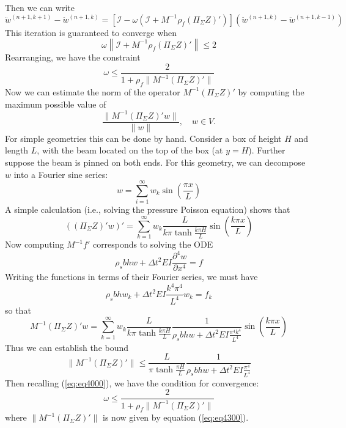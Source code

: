 \documentclass{article}
\begin{document}
Then we can write
\[\ddot{w}^{(n+1,k+1)} - \ddot{w}^{(n+1,k)} = \left[\mathcal{I}-\omega\left(\mathcal{I}+ M^{-1}\rho_f  \left(\Pi_{\Sigma}Z\right)'\right) \right] (\ddot{w}^{(n+1,k)}-\ddot{w}^{(n+1,k-1)}) \]
This iteration is guaranteed to converge when
\[ \omega\left\|\mathcal{I}+ M^{-1}\rho_f  \left(\Pi_{\Sigma}Z\right)'\right\|  \leq 2 \]
Rearranging, we have the constraint
\begin{equation}  \omega \leq \frac{2}{1+\rho_f\|M^{-1}\left(\Pi_{\Sigma}Z\right)'\| } \label{eq:eq4000} \end{equation}
Now we can estimate the norm of the operator $M^{-1}\left(\Pi_{\Sigma}Z\right)'$ by computing the maximum possible value of 
\[\frac{\|M^{-1}\left(\Pi_{\Sigma}Z\right)'w\|}{\|w\|}, \quad w \in V.\]
For simple geometries this can be done by hand. 
Consider a box of height $H$ and length $L$, with the beam located on the top of the box (at $y=H$).
Further suppose the beam is pinned on both ends.
For this geometry, we can decompose $w$ into a Fourier sine series:
\begin{equation} w = \sum_{i=1}^{\infty} w_k \sin{\left(\frac{\pi x}{L} \right)} \label{eq:eq4100} \end{equation}
A simple calculation (i.e., solving the pressure Poisson equation) shows that
\[ \left(\left(\Pi_{\Sigma}Z\right)'w\right)' = \sum_{k=1}^{\infty} w_k\frac{L}{k\pi \tanh{\frac{k\pi H}{L}}} \sin{\left(\frac{k\pi x}{L} \right)} \]
Now computing $M^{-1} f'$ corresponds to solving the ODE
\[ \rho_s b h w + \Delta t^2 EI \frac{\partial ^4 w}{\partial x^4} = f \]
Writing the functions in terms of their Fourier series, 
we must have 
\begin{equation} \rho_s b h w_k + \Delta t^2 EI \frac{k^4 \pi^4}{L^4}w_k = f_k \label{eq:eq4200} \end{equation}
so that 
\[ M^{-1}\left(\Pi_{\Sigma}Z\right)'w= \sum_{k=1}^{\infty} w_k\frac{L}{k\pi \tanh{\frac{k\pi H}{L}}}\frac{1}{\rho_s b h w + \Delta t^2 EI\frac{\pi^4k^4}{L^4}} \sin{\left(\frac{k\pi x}{L} \right)} \]
Thus we can establish the bound
\begin{equation}  \| M^{-1}\left(\Pi_{\Sigma}Z\right)' \| \leq \frac{L}{\pi \tanh{\frac{\pi H}{L}}}\frac{1}{\rho_s b h w + \Delta t^2 EI\frac{\pi^4}{L^4}} \label{eq:eq4300} \end{equation}
Then recalling (\ref{eq:eq4000}), we have the condition for convergence:
\[ \omega \leq \frac{2}{1+\rho_f\|M^{-1}\left(\Pi_{\Sigma}Z\right)'\| } \]
where $\|M^{-1}\left(\Pi_{\Sigma}Z\right)'\|$ is now given by equation (\ref{eq:eq4300}).
\end{document}

